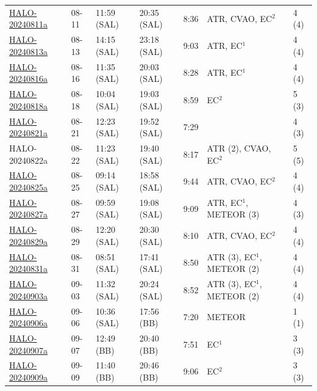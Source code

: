\begin{table}
\begin{tabular}{lllllll}
\href{https://orcestra-campaign.org/reports/HALO-20240811a.html}{HALO-20240811a} & 08-11 & 11:59 (SAL) & 20:35 (SAL) & 8:36 & ATR, CVAO, EC$^{2}$ & 4 (4) \\
\href{https://orcestra-campaign.org/reports/HALO-20240813a.html}{HALO-20240813a} & 08-13 & 14:15 (SAL) & 23:18 (SAL) & 9:03 & ATR, EC$^{1}$ & 4 (4) \\
\href{https://orcestra-campaign.org/reports/HALO-20240816a.html}{HALO-20240816a} & 08-16 & 11:35 (SAL) & 20:03 (SAL) & 8:28 & ATR, EC$^{1}$ & 4 (4) \\
\href{https://orcestra-campaign.org/reports/HALO-20240818a.html}{HALO-20240818a} & 08-18 & 10:04 (SAL) & 19:03 (SAL) & 8:59 & EC$^{2}$ & 5 (3) \\
\href{https://orcestra-campaign.org/reports/HALO-20240821a.html}{HALO-20240821a} & 08-21 & 12:23 (SAL) & 19:52 (SAL) & 7:29 &  & 4 (3) \\
HALO-20240822a & 08-22 & 11:23 (SAL) & 19:40 (SAL) & 8:17 & ATR (2), CVAO, EC$^{2}$ & 5 (5) \\
\href{https://orcestra-campaign.org/reports/HALO-20240825a.html}{HALO-20240825a} & 08-25 & 09:14 (SAL) & 18:58 (SAL) & 9:44 & ATR, CVAO, EC$^{2}$ & 4 (4) \\
\href{https://orcestra-campaign.org/reports/HALO-20240827a.html}{HALO-20240827a} & 08-27 & 09:59 (SAL) & 19:08 (SAL) & 9:09 & ATR, EC$^{1}$, METEOR (3) & 4 (3) \\
\href{https://orcestra-campaign.org/reports/HALO-20240829a.html}{HALO-20240829a} & 08-29 & 12:20 (SAL) & 20:30 (SAL) & 8:10 & ATR, CVAO, EC$^{2}$ & 4 (4) \\
\href{https://orcestra-campaign.org/reports/HALO-20240831a.html}{HALO-20240831a} & 08-31 & 08:51 (SAL) & 17:41 (SAL) & 8:50 & ATR (3), EC$^{1}$, METEOR (2) & 4 (4) \\
\href{https://orcestra-campaign.org/reports/HALO-20240903a.html}{HALO-20240903a} & 09-03 & 11:32 (SAL) & 20:24 (SAL) & 8:52 & ATR (3), EC$^{1}$, METEOR (2) & 4 (4) \\
\href{https://orcestra-campaign.org/reports/HALO-20240906a.html}{HALO-20240906a} & 09-06 & 10:36 (SAL) & 17:56 (BB) & 7:20 & METEOR & 1 (1) \\
\href{https://orcestra-campaign.org/reports/HALO-20240907a.html}{HALO-20240907a} & 09-07 & 12:49 (BB) & 20:40 (BB) & 7:51 & EC$^{1}$ & 3 (3) \\
\href{https://orcestra-campaign.org/reports/HALO-20240909a.html}{HALO-20240909a} & 09-09 & 11:40 (BB) & 20:46 (BB) & 9:06 & EC$^{2}$ & 3 (3) \\

\end{tabular}
\end{table}
